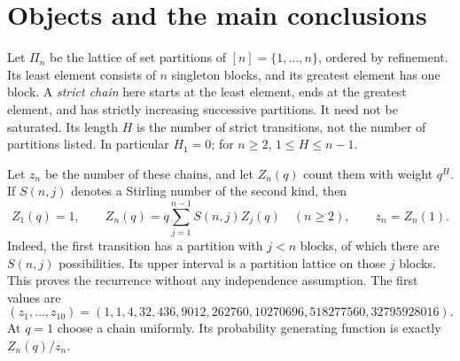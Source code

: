 \documentclass[11pt,letterpaper]{article}
\theoremstyle{definition}\newtheorem{definition}[theorem]{Definition}
\theoremstyle{remark}\newtheorem{remark}[theorem]{Remark}
\begin{document}
\section{Objects and the main conclusions}
Let $\Pi_n$ be the lattice of set partitions of $[n]=\{1,\ldots,n\}$, ordered by refinement. Its least element consists of $n$ singleton blocks, and its greatest element has one block. A \emph{strict chain} here starts at the least element, ends at the greatest element, and has strictly increasing successive partitions. It need not be saturated. Its length $H$ is the number of strict transitions, not the number of partitions listed. In particular $H_1=0$; for $n\ge2$, $1\le H\le n-1$.

Let $z_n$ be the number of these chains, and let $Z_n(q)$ count them with weight $q^H$. If $S(n,j)$ denotes a Stirling number of the second kind, then
\begin{equation}\label{spc:eq:recurrence}
 Z_1(q)=1,\qquad Z_n(q)=q\sum_{j=1}^{n-1}S(n,j)Z_j(q)\quad(n\ge2),
 \qquad z_n=Z_n(1).
\end{equation}
Indeed, the first transition has a partition with $j<n$ blocks, of which there are $S(n,j)$ possibilities. Its upper interval is a partition lattice on those $j$ blocks. This proves the recurrence without any independence assumption. The first values are
\[
(z_1,\ldots,z_{10})=(1,1,4,32,436,9012,262760,10270696,518277560,32795928016).
\]
At $q=1$ choose a chain uniformly. Its probability generating function is exactly $Z_n(q)/z_n$.
\end{document}
